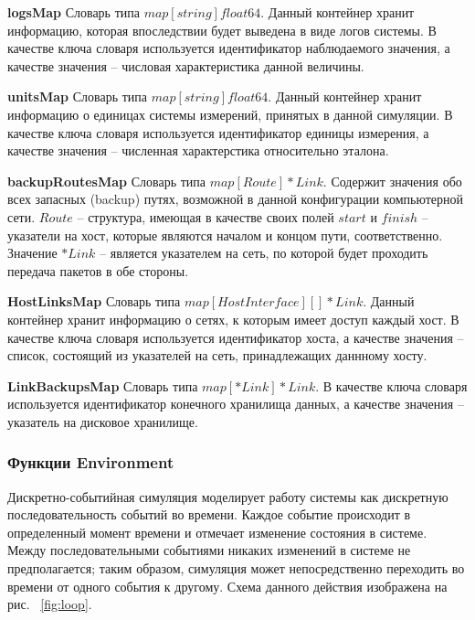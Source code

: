 \begin{itemize}
\textbf{logsMap}  
Словарь типа $map[string]float64$. Данный контейнер хранит информацию, которая впоследствии будет выведена в виде логов системы.  В качестве ключа словаря используется идентификатор наблюдаемого значения, а качестве значения -- числовая характеристика данной величины.

\textbf{unitsMap} 
Словарь типа $map[string]float64$. Данный контейнер хранит информацию о единицах системы измерений, принятых в данной симуляции. В качестве ключа словаря используется идентификатор единицы измерения, а качестве значения -- численная характерстика относительно эталона.

\textbf{backupRoutesMap} 
Словарь типа  $map[Route]*Link$. Содержит значения обо всех запасных (backup) путях, возможной в данной конфигурации компьютерной сети. $Route$ -- структура, имеющая в качестве своих полей $start$ и $finish$ -- указатели на хост, которые являются началом и концом пути, соответственно. Значение $*Link$ -- является указателем на сеть, по которой будет проходить передача пакетов в обе стороны.

\textbf{HostLinksMap}
Словарь типа $map[HostInterface][]*Link$. Данный контейнер хранит информацию о сетях, к которым имеет доступ каждый хост. В качестве ключа словаря используется идентификатор хоста, а качестве значения -- список, состоящий из указателей на сеть, принадлежащих даннному хосту.

\textbf{LinkBackupsMap}  
Словарь типа $map[*Link]*Link$.  В качестве ключа словаря используется идентификатор конечного хранилища данных, а качестве значения -- указатель на дисковое хранилище.
\end{itemize}
\subsubsection{Функции Environment}
\par 
Дискретно-событийная симуляция моделирует работу системы как дискретную последовательность событий во времени. Каждое событие происходит в определенный момент времени и отмечает изменение состояния в системе. Между последовательными событиями никаких изменений в системе не предполагается; таким образом, симуляция может непосредственно переходить во времени от одного события к другому. Схема данного действия изображена на рис. ~\ref{fig:loop}.

